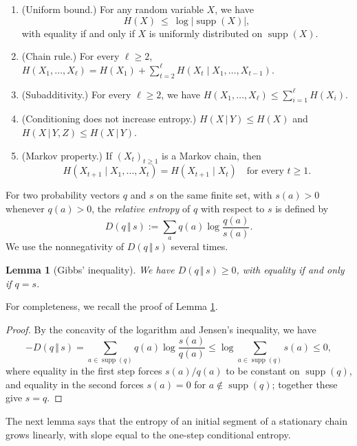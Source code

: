 \documentclass[11pt, a4paper]{article}
\newtheorem{lemma}[theorem]{Lemma}
\theoremstyle{definition}
\theoremstyle{plain}
\renewcommand{\le}{\leqslant}
\renewcommand{\ge}{\geqslant}
\newcommand{\supp}{\operatorname{supp}}
\begin{document}
\begin{enumerate}
\item[E1] (Uniform bound.) For any random variable $X$, we have 
  $$ H(X) \ \le \  \log |\supp (X)|, $$ 
  with equality if and
  only if $X$ is uniformly distributed on $\supp (X)$.
  
\item[E2] (Chain rule.) For every $\ell \ge 2$,
$
    H(X_1,\ldots ,X_\ell)=H(X_1)
      + \sum_{t=2}^{\ell}H(X_t\mid X_1,\ldots ,X_{t-1})$.
  
  \item[E3] 
  (Subadditivity.) For every $\ell \ge 2$, we have 
  $H(X_1,\ldots ,X_{\ell}) \le \sum_{i=1}^{\ell} H(X_i)$.
  
  \item[E4] (Conditioning does not increase entropy.) 
  $H(X\,|\,Y)\le H(X)$ and $H(X\,|\,Y,Z) \le H(X\,|\,Y)$. 
  
\item[E5] (Markov property.) If $(X_t)_{t\ge 1}$ is
  a Markov chain, then
  \[
    H(X_{t+1}\mid X_1,\ldots ,X_t)
      =H(X_{t+1}\mid X_t)
    \quad \text{for every }t\ge 1.
  \]
 \end{enumerate}
 
 
 For two probability vectors $q$ and $s$
on the same finite set, with $s(a)>0$ whenever
$q(a)>0$, the {\it relative entropy} of $q$ with respect to
$s$ is defined by 
\[
  D(q\,\Vert \,s):=\sum_a q(a)\log \frac{q(a)}{s(a)}.
\]
We use the nonnegativity of $D(q\,\Vert\,s)$ several times. 

 \begin{lemma}[Gibbs' inequality]  \label{lem-Gibb}
 We have $D(q\,\Vert \,s)\ge 0$,
  with equality if and only if $q=s$.
 \end{lemma}
 
For completeness,  we recall the proof of Lemma \ref{lem-Gibb}.

\begin{proof}
By the concavity of the logarithm and Jensen's inequality, we have 
\[
  -D(q\,\Vert \,s)
  =\sum_{a\in \supp (q)}q(a)
     \log \frac{s(a)}{q(a)}
  \le \log \!\sum_{a\in \supp (q)}\!\! s(a)
  \le 0 ,
\]
where equality in the first step forces $s(a)/q(a)$ to be
constant on $\supp (q)$, and equality in the second
forces $s(a)=0$ for $a\notin \supp (q)$; together these
give $s=q$. 
\end{proof}

The next lemma  says that the entropy of an
initial segment of a stationary chain grows linearly,
with slope equal to the one-step conditional entropy. 
\end{document}
